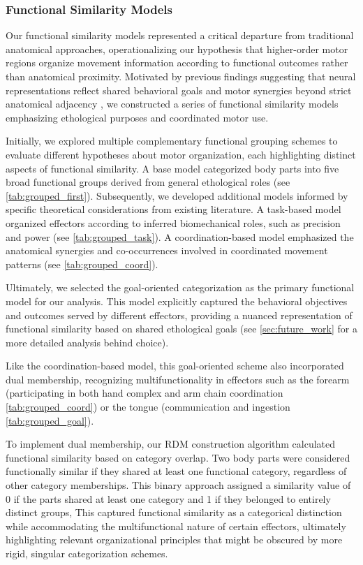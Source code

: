 \documentclass{article}
\begin{document}
\subsubsection{Functional Similarity Models}\label{models}
Our functional similarity models represented a critical departure from traditional anatomical approaches, operationalizing our hypothesis that higher-order motor regions organize movement information according to functional outcomes rather than anatomical proximity. Motivated by previous findings suggesting that neural representations reflect shared behavioral goals and motor synergies beyond strict anatomical adjacency \citep{ejaz2015}, we constructed a series of functional similarity models emphasizing ethological purposes and coordinated motor use.

Initially, we explored multiple complementary functional grouping schemes to evaluate different hypotheses about motor organization, each highlighting distinct aspects of functional similarity. A base model categorized body parts into five broad functional groups derived from general ethological roles (see \ref{tab:grouped_first}). Subsequently, we developed additional models informed by specific theoretical considerations from existing literature. A task-based model organized effectors according to inferred biomechanical roles, such as precision and power (see \ref{tab:grouped_task}). A coordination-based model emphasized the anatomical synergies and co-occurrences involved in coordinated movement patterns (see \ref{tab:grouped_coord}). 

Ultimately, we selected the goal-oriented categorization as the primary functional model for our analysis. This model explicitly captured the behavioral objectives and outcomes served by different effectors, providing a nuanced representation of functional similarity based on shared ethological goals (see \ref{sec:future_work} for a more detailed analysis behind choice).

Like the coordination-based model, this goal-oriented scheme also incorporated dual membership, recognizing multifunctionality in effectors such as the forearm (participating in both hand complex and arm chain coordination \ref{tab:grouped_coord}) or the tongue (communication and ingestion \ref{tab:grouped_goal}).

To implement dual membership, our RDM construction algorithm calculated functional similarity based on category overlap. Two body parts were considered functionally similar if they shared at least one functional category, regardless of other category memberships. This binary approach assigned a similarity value of 0 if the parts shared at least one category and 1 if they belonged to entirely distinct groups, 
This captured functional similarity as a categorical distinction while accommodating the multifunctional nature of certain effectors, ultimately highlighting relevant organizational principles that might be obscured by
more rigid, singular categorization schemes.
\end{document}
